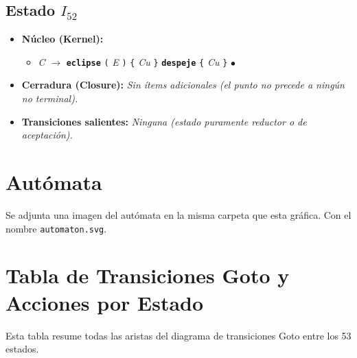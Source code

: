 \documentclass[12pt, letterpaper]{article}
\begin{document}
\subsection*{Estado $I_{52}$ }
\begin{itemize}\setlength{\itemsep}{1pt}\setlength{\parskip}{0pt}
\item \textbf{Núcleo (Kernel):}
\begin{itemize}\setlength{\itemsep}{1pt}\setlength{\parskip}{0pt}
    \item \textit{C} $\to$ \textbf{\texttt{eclipse}} \texttt{(} \textit{E} \texttt{)} \texttt{\{} \textit{Cu} \texttt{\}} \textbf{\texttt{despeje}} \texttt{\{} \textit{Cu} \texttt{\}} $\bullet$ 
\end{itemize}
\item \textbf{Cerradura (Closure):} \emph{Sin ítems adicionales (el punto no precede a ningún no terminal).}
\item \textbf{Transiciones salientes:} \emph{Ninguna (estado puramente reductor o de aceptación).}
\end{itemize}
\vspace{2pt}
\newpage

\section{Autómata}
Se adjunta una imagen del autómata en la misma carpeta que esta gráfica. Con el nombre \texttt{automaton.svg}.

\section{Tabla de Transiciones Goto y Acciones por Estado}

Esta tabla resume todas las aristas del diagrama de transiciones Goto entre los 53 estados.
\end{document}
